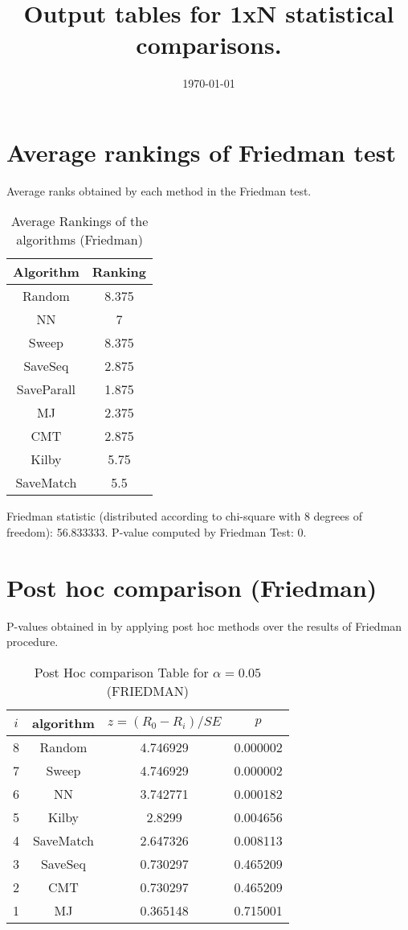 \documentclass[a4paper,10pt]{article}
\title{Output tables for 1xN statistical comparisons.}
\author{}
\date{\today}
\begin{document}
\begin{landscape}
\pagestyle{empty}
\maketitle
\thispagestyle{empty}

\section{Average rankings of Friedman test}


Average ranks obtained by each method in the Friedman test.

\begin{table}[!htp]
\centering
\begin{tabular}{|c|c|}\hline
Algorithm&Ranking\\\hline
Random&8.375\\NN&7\\Sweep&8.375\\SaveSeq&2.875\\SaveParall&1.875\\MJ&2.375\\CMT&2.875\\Kilby&5.75\\SaveMatch&5.5\\\hline\end{tabular}
\caption{Average Rankings of the algorithms (Friedman)}
\end{table}

Friedman statistic (distributed according to chi-square with 8 degrees of freedom): 56.833333. \newline P-value computed by Friedman Test: 0.\newline


\newpage

\section{Post hoc comparison (Friedman)}


P-values obtained in by applying post hoc methods over the results of Friedman procedure.

\begin{table}[!htp]
\centering\footnotesize
\begin{tabular}{cccc}
$i$&algorithm&$z=(R_0 - R_i)/SE$&$p$\\
\hline8&Random&4.746929&0.000002\\7&Sweep&4.746929&0.000002\\6&NN&3.742771&0.000182\\5&Kilby&2.8299&0.004656\\4&SaveMatch&2.647326&0.008113\\3&SaveSeq&0.730297&0.465209\\2&CMT&0.730297&0.465209\\1&MJ&0.365148&0.715001\\\hline
\end{tabular}
\caption{Post Hoc comparison Table for $\alpha=0.05$ (FRIEDMAN)}
\end{table}
\newpage


\end{landscape}
\end{document}
